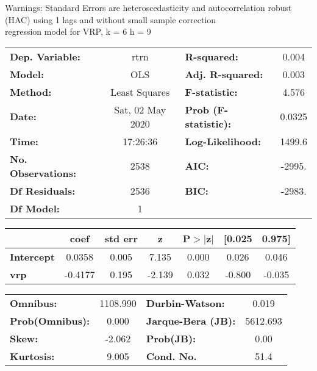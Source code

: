 Warnings: \newline
 [1] Standard Errors are heteroscedasticity and autocorrelation robust (HAC) using 1 lags and without small sample correction\\ 

regression model for VRP, k = 6 h = 9\begin{center}
\begin{tabular}{lclc}
\toprule
\textbf{Dep. Variable:}    &       rtrn       & \textbf{  R-squared:         } &     0.004   \\
\textbf{Model:}            &       OLS        & \textbf{  Adj. R-squared:    } &     0.003   \\
\textbf{Method:}           &  Least Squares   & \textbf{  F-statistic:       } &     4.576   \\
\textbf{Date:}             & Sat, 02 May 2020 & \textbf{  Prob (F-statistic):} &   0.0325    \\
\textbf{Time:}             &     17:26:36     & \textbf{  Log-Likelihood:    } &    1499.6   \\
\textbf{No. Observations:} &        2538      & \textbf{  AIC:               } &    -2995.   \\
\textbf{Df Residuals:}     &        2536      & \textbf{  BIC:               } &    -2983.   \\
\textbf{Df Model:}         &           1      & \textbf{                     } &             \\
\bottomrule
\end{tabular}
\begin{tabular}{lcccccc}
                   & \textbf{coef} & \textbf{std err} & \textbf{z} & \textbf{P$> |$z$|$} & \textbf{[0.025} & \textbf{0.975]}  \\
\midrule
\textbf{Intercept} &       0.0358  &        0.005     &     7.135  &         0.000        &        0.026    &        0.046     \\
\textbf{vrp}       &      -0.4177  &        0.195     &    -2.139  &         0.032        &       -0.800    &       -0.035     \\
\bottomrule
\end{tabular}
\begin{tabular}{lclc}
\textbf{Omnibus:}       & 1108.990 & \textbf{  Durbin-Watson:     } &    0.019  \\
\textbf{Prob(Omnibus):} &   0.000  & \textbf{  Jarque-Bera (JB):  } & 5612.693  \\
\textbf{Skew:}          &  -2.062  & \textbf{  Prob(JB):          } &     0.00  \\
\textbf{Kurtosis:}      &   9.005  & \textbf{  Cond. No.          } &     51.4  \\
\bottomrule
\end{tabular}
\end{center}

